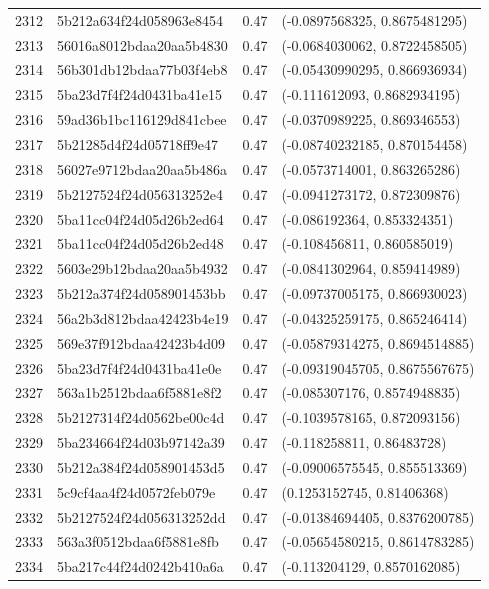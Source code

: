 \begin{table}[ht]
\begin{tabular}{rlrl}
  2312 & 5b212a634f24d058963e8454 & 0.47 & (-0.0897568325, 0.8675481295) \\ 
  2313 & 56016a8012bdaa20aa5b4830 & 0.47 & (-0.0684030062, 0.8722458505) \\ 
  2314 & 56b301db12bdaa77b03f4eb8 & 0.47 & (-0.05430990295, 0.866936934) \\ 
  2315 & 5ba23d7f4f24d0431ba41e15 & 0.47 & (-0.111612093, 0.8682934195) \\ 
  2316 & 59ad36b1bc116129d841cbee & 0.47 & (-0.0370989225, 0.869346553) \\ 
  2317 & 5b21285d4f24d05718ff9e47 & 0.47 & (-0.08740232185, 0.870154458) \\ 
  2318 & 56027e9712bdaa20aa5b486a & 0.47 & (-0.0573714001, 0.863265286) \\ 
  2319 & 5b2127524f24d056313252e4 & 0.47 & (-0.0941273172, 0.872309876) \\ 
  2320 & 5ba11cc04f24d05d26b2ed64 & 0.47 & (-0.086192364, 0.853324351) \\ 
  2321 & 5ba11cc04f24d05d26b2ed48 & 0.47 & (-0.108456811, 0.860585019) \\ 
  2322 & 5603e29b12bdaa20aa5b4932 & 0.47 & (-0.0841302964, 0.859414989) \\ 
  2323 & 5b212a374f24d058901453bb & 0.47 & (-0.09737005175, 0.866930023) \\ 
  2324 & 56a2b3d812bdaa42423b4e19 & 0.47 & (-0.04325259175, 0.865246414) \\ 
  2325 & 569e37f912bdaa42423b4d09 & 0.47 & (-0.05879314275, 0.8694514885) \\ 
  2326 & 5ba23d7f4f24d0431ba41e0e & 0.47 & (-0.09319045705, 0.8675567675) \\ 
  2327 & 563a1b2512bdaa6f5881e8f2 & 0.47 & (-0.085307176, 0.8574948835) \\ 
  2328 & 5b2127314f24d0562be00c4d & 0.47 & (-0.1039578165, 0.872093156) \\ 
  2329 & 5ba234664f24d03b97142a39 & 0.47 & (-0.118258811, 0.86483728) \\ 
  2330 & 5b212a384f24d058901453d5 & 0.47 & (-0.09006575545, 0.855513369) \\ 
  2331 & 5c9cf4aa4f24d0572feb079e & 0.47 & (0.1253152745, 0.81406368) \\ 
  2332 & 5b2127524f24d056313252dd & 0.47 & (-0.01384694405, 0.8376200785) \\ 
  2333 & 563a3f0512bdaa6f5881e8fb & 0.47 & (-0.05654580215, 0.8614783285) \\ 
  2334 & 5ba217c44f24d0242b410a6a & 0.47 & (-0.113204129, 0.8570162085) \\ 

\end{tabular}
\end{table}
